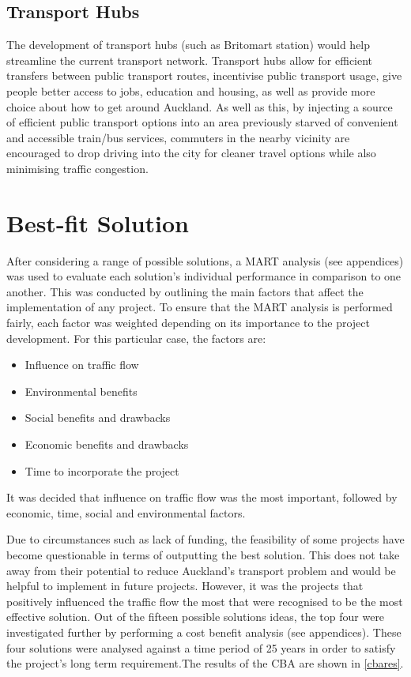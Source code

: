 \documentclass[twoside, a4paper, 11pt]{article}
\begin{document}
\subsection{Transport Hubs}
The development of transport hubs (such as Britomart station) would help streamline the current transport network. Transport hubs allow for efficient transfers between public transport routes, incentivise public transport usage, give people better access to jobs, education and housing, as well as provide more choice about how to get around Auckland. As well as this, by injecting a source of efficient public transport options into an area previously starved of convenient and accessible train/bus services, commuters in the nearby vicinity are encouraged to drop driving into the city for cleaner travel options while also minimising traffic congestion. 

\newpage


\section{Best-fit Solution}
After considering a range of possible solutions, a MART analysis (see appendices) was used to evaluate each solution's individual performance in comparison to one another. This was conducted by outlining the main factors that affect the implementation of any project. To ensure that the MART analysis is performed fairly, each factor was weighted depending on its importance to the project development. For this particular case, the factors are:
\begin{itemize}
\item Influence on traffic flow
\item Environmental benefits
\item Social benefits and drawbacks
\item Economic benefits and drawbacks
\item Time to incorporate the project
\end{itemize}

It was decided that influence on traffic flow was the most important, followed by economic, time, social and environmental factors.

Due to circumstances such as lack of funding, the feasibility of some projects have become questionable in terms of outputting the best solution. This does not take away from their potential to reduce Auckland's transport problem and would be helpful to implement in future projects. However, it was the projects that positively influenced the traffic flow the most that were recognised to be the most effective solution. Out of the fifteen possible solutions ideas, the top four were investigated further by performing a cost benefit analysis (see appendices). These four solutions were analysed against a time period of 25 years in order to satisfy the project's long term requirement.The results of the CBA are shown in \cref{cbares}.
\end{document}
